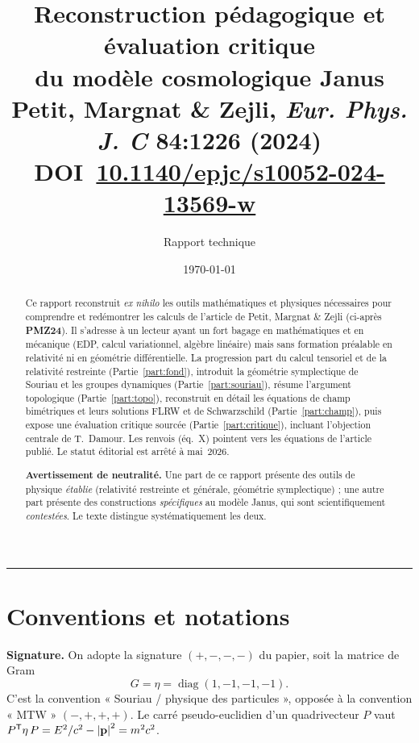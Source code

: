 \documentclass[11pt,a4paper]{article}
\title{\bfseries Reconstruction pédagogique et évaluation critique\\
du modèle cosmologique Janus\\[4pt]
\large Petit, Margnat \& Zejli, \emph{Eur. Phys. J. C} \textbf{84}:1226 (2024)\\
\normalsize DOI~\href{https://doi.org/10.1140/epjc/s10052-024-13569-w}{10.1140/epjc/s10052-024-13569-w}}
\author{Rapport technique}
\date{\today}
\theoremstyle{definition}
\theoremstyle{plain}
\newcommand{\diag}{\operatorname{diag}}
\newcommand{\eqpaper}[1]{\textsf{(éq.~#1)}}   %
\begin{document}
\maketitle

\begin{abstract}
\noindent
Ce rapport reconstruit \emph{ex nihilo} les outils mathématiques et physiques nécessaires
pour comprendre et redémontrer les calculs de l'article de Petit, Margnat \& Zejli
(ci-après \textbf{PMZ24}). Il s'adresse à un lecteur ayant un fort bagage en mathématiques
et en mécanique (EDP, calcul variationnel, algèbre linéaire) mais sans formation préalable
en relativité ni en géométrie différentielle. La progression part du calcul tensoriel et
de la relativité restreinte (Partie~\ref{part:fond}), introduit la géométrie symplectique
de Souriau et les groupes dynamiques (Partie~\ref{part:souriau}), résume l'argument
topologique (Partie~\ref{part:topo}), reconstruit en détail les équations de champ
bimétriques et leurs solutions FLRW et de Schwarzschild (Partie~\ref{part:champ}), puis
expose une évaluation critique sourcée (Partie~\ref{part:critique}), incluant l'objection
centrale de T.~Damour. Les renvois \eqpaper{X} pointent vers les équations de l'article
publié. Le statut éditorial est arrêté à mai~2026.

\medskip
\noindent\textbf{Avertissement de neutralité.} Une part de ce rapport présente des outils
de physique \emph{établie} (relativité restreinte et générale, géométrie symplectique) ;
une autre part présente des constructions \emph{spécifiques} au modèle Janus, qui sont
scientifiquement \emph{contestées}. Le texte distingue systématiquement les deux.
\end{abstract}

\tableofcontents
\bigskip\hrule\bigskip

\section*{Conventions et notations}

\textbf{Signature.} On adopte la signature $(+,-,-,-)$ du papier, soit la matrice de Gram
\begin{equation}
G=\eta=\diag(1,-1,-1,-1).
\label{eq:gram}
\end{equation}
C'est la convention « Souriau / physique des particules », opposée à la convention « MTW »
$(-,+,+,+)$. Le carré pseudo-euclidien d'un quadrivecteur $P$ vaut
$P^{\mathsf T}\eta\,P=E^2/c^2-\abs{\vb p}^2=m^2c^2$.
\end{document}
